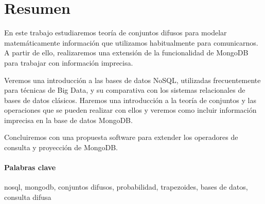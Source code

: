 \section{Resumen}

En este trabajo estudiaremos teoría de conjuntos difusos para modelar matemáticamente información que utilizamos habitualmente para comunicarnos. A partir de ello, realizaremos una extensión de la funcionalidad de MongoDB para trabajar con información imprecisa.

Veremos una introducción a las bases de datos NoSQL, utilizadas frecuentemente para técnicas de Big Data, y su comparativa con los sistemas relacionales de bases de datos clásicos. Haremos una introducción a la teoría de conjuntos y las operaciones que se pueden realizar con ellos y veremos como incluir información imprecisa en la base de datos MongoDB.

Concluiremos con una propuesta software para extender los operadores de consulta y proyección de MongoDB.

\paragraph{Palabras clave} nosql, mongodb, conjuntos difusos, probabilidad, trapezoides, bases de datos, consulta difusa

\newpage
